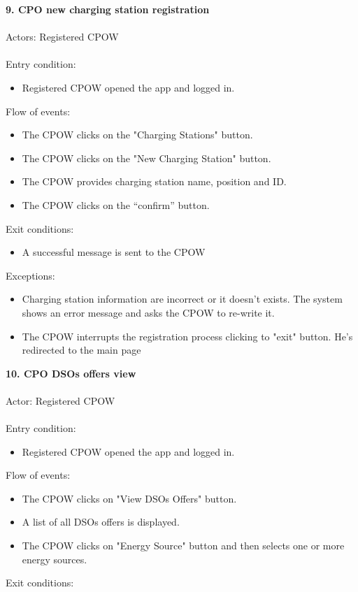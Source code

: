 \documentclass[a4paper]{report}
\begin{document}
\textbf{9. CPO new charging station registration}\label{uc:1}
\\
\\
Actors: Registered CPOW\\ \\
Entry condition: 
\begin{itemize}
\item Registered CPOW opened the app and logged in.
\end{itemize}
Flow of events:
\begin{itemize}
\item The CPOW clicks on the "Charging Stations" button.
\item The CPOW clicks on the "New Charging Station" button.
\item The CPOW provides charging station name, position and ID.
\item The CPOW clicks on the “confirm” button.
\end{itemize}
Exit conditions: 
\begin{itemize}
\item A successful message is sent to the CPOW
\end{itemize}
Exceptions: 
\begin{itemize}
\item Charging station information are incorrect or it doesn't exists. The system shows an error message and asks the CPOW to re-write it.
\item The CPOW interrupts the registration process clicking to "exit" button. He's redirected to the main page
\end{itemize}
\textbf{10. CPO DSOs offers view}\label{uc:8}
\\ \\
Actor: Registered CPOW \\ \\
Entry condition: 
\begin{itemize}
\item Registered CPOW opened the app and logged in.
\end{itemize}
Flow of events:
\begin{itemize}
\item The CPOW clicks on "View DSOs Offers" button.
\item A list of all DSOs offers is displayed.
\item The CPOW clicks on "Energy Source" button and then selects one or more energy sources.
\end{itemize}
Exit conditions: 
\end{document}
